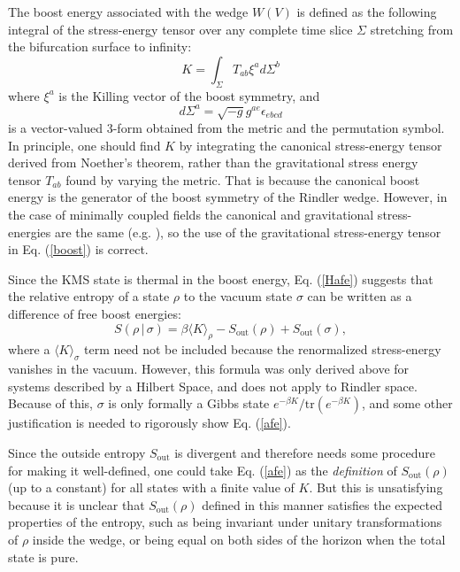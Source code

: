 \documentclass[12pt]{article}
\begin{document}
The boost energy associated with the wedge $W(V)$ is defined as the following integral of the stress-energy tensor over any complete time slice $\Sigma$ stretching from the bifurcation surface to infinity:
\begin{equation}\label{boost}
K = \int_\Sigma T_{ab} \xi^a d\Sigma^b
\end{equation}
where $\xi^a$ is the Killing vector of the boost symmetry, and 
\begin{equation}
d\Sigma^a = \sqrt{-g} g^{ae} \epsilon_{ebcd}
\end{equation}
is a vector-valued 3-form obtained from the metric and the permutation symbol.  In principle, one should find $K$ by integrating the canonical stress-energy tensor derived from Noether's theorem, rather than the gravitational stress energy tensor $T_{ab}$ found by varying the metric.  That is because the canonical boost energy is the generator of the boost symmetry of the Rindler wedge.  However, in the case of minimally coupled fields the canonical and gravitational stress-energies are the same (e.g. \cite{fursaev99}), so the use of the gravitational stress-energy tensor in Eq. (\ref{boost}) is correct.

Since the KMS state is thermal in the boost energy, Eq. (\ref{Hafe}) suggests that the relative entropy of a state $\rho$ to the vacuum state $\sigma$ can be written as a difference of free boost energies:
\begin{equation}\label{afe}
S(\rho\,|\,\sigma) = \beta \langle K \rangle_\rho - S_\mathrm{out}(\rho) + S_\mathrm{out}(\sigma),
\end{equation}
where a $\langle K \rangle_{\sigma}$ term need not be included because the renormalized stress-energy vanishes in the vacuum.  However, this formula was only derived above for systems  described by a Hilbert Space, and does not apply to Rindler space.  Because of this, $\sigma$ is only formally a Gibbs state $e^{-\beta K}/\mathrm{tr}(e^{-\beta K})$, and some other justification is needed to rigorously show Eq. (\ref{afe}).

Since the outside entropy $S_\mathrm{out}$ is divergent and therefore needs some procedure for making it well-defined, one could take Eq. (\ref{afe}) as the \emph{definition} of $S_\mathrm{out}(\rho)$ (up to a constant) for all states with a finite value of $K$.  But this is unsatisfying because it is unclear that $S_\mathrm{out}(\rho)$ defined in this manner satisfies the expected properties of the entropy, such as being invariant under unitary transformations of $\rho$ inside the wedge, or being equal on both sides of the horizon when the total state is pure.
\end{document}
